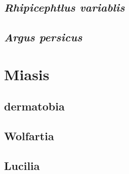 \subsection{\textit{Rhipicephtlus variablis}}
\subsection{\textit{Argus persicus}}
\section{Miasis}
\subsection{dermatobia}
\subsection{Wolfartia}
\subsection{Lucilia}